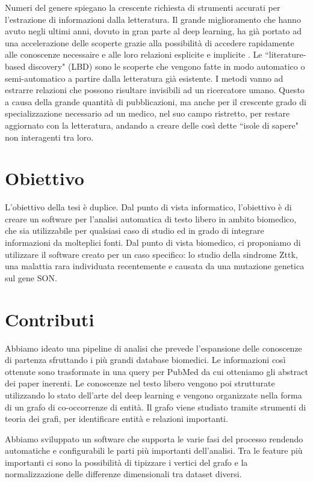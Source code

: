 \documentclass[12pt]{report}
\newcommand{\quotes}[1]{``#1"}
\begin{document}
Numeri del genere spiegano la crescente richiesta di strumenti accurati per l'estrazione di informazioni dalla letteratura. Il grande miglioramento che hanno avuto negli ultimi anni, dovuto in gran parte al deep learning, ha già portato ad una accelerazione delle scoperte grazie alla possibilità di accedere rapidamente alle conoscenze necessaire e alle loro relazioni esplicite e implicite \cite{miningbook, recentadv}. 
Le \quotes{literature-based discovery} (LBD) \cite{literaturebased} sono le scoperte che vengono fatte in modo automatico o semi-automatico a partire dalla letteratura già esistente. I metodi vanno ad estrarre relazioni che possono risultare invisibili ad un ricercatore umano. Questo a causa della grande quantità di pubblicazioni, ma anche per il crescente grado di specializzazione necessario ad un medico, nel suo campo ristretto, per restare aggiornato con la letteratura, andando a creare delle così dette \quotes{isole di sapere} non interagenti tra loro.



\section{Obiettivo}
L'obiettivo della tesi è duplice.
Dal punto di vista informatico, l'obiettivo è di creare un software per l'analisi automatica di testo libero in ambito biomedico, che sia utilizzabile per qualsiasi caso di studio ed in grado di integrare informazioni da molteplici fonti.
Dal punto di vista biomedico, ci proponiamo di utilizzare il software creato per un caso specifico: lo studio della sindrome Zttk, una malattia rara individuata recentemente e causata da una mutazione genetica sul gene SON.


\section{Contributi}
Abbiamo ideato una pipeline di analisi che prevede l'espansione delle conoscenze di partenza sfruttando i più grandi database biomedici. Le informazioni così ottenute sono trasformate in una query per PubMed da cui otteniamo gli abstract dei paper inerenti. Le conoscenze nel testo libero vengono poi strutturate utilizzando lo stato dell'arte del deep learning e vengono organizzate nella forma di un grafo di co-occorrenze di entità. Il grafo viene studiato tramite strumenti di teoria dei grafi, per identificare entità e relazioni importanti.  

Abbiamo sviluppato un software che supporta le varie fasi del processo rendendo automatiche e configurabili le parti più importanti dell'analisi. Tra le feature più importanti ci sono la possibilità di tipizzare i vertici del grafo e la normalizzazione delle differenze dimensionali tra dataset diversi.
\end{document}
